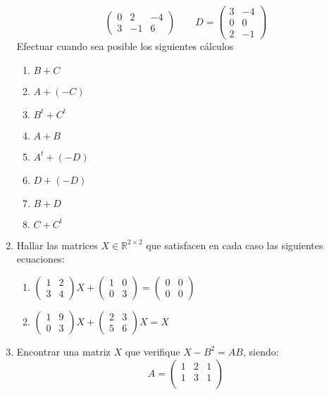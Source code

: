 \documentclass[12pt]{article}
\begin{document}
\begin{enumerate}
\[\begin{pmatrix}
0 & 2 & -4 \\
3 & -1 & 6
\end{pmatrix}
\qquad
D = \begin{pmatrix}
3 & -4\\
0 & 0\\
2 & -1
\end{pmatrix}
\]
Efectuar cuando sea posible los siguientes cálculos
\begin{multicols}{4}
\begin{enumerate}
  \item $B+C$
  \item $A+(-C)$
  \item $B^t + C^t$
  \item $A + B$
  \item $A^t + (-D)$
  \item $D+(-D)$
  \item $B + D$
  \item $C+C^t$
\end{enumerate}
\end{multicols}
\item Hallar las matrices $X \in \mathbb{R}^{2\times2}$ que satisfacen en cada caso las siguientes ecuaciones:
\begin{enumerate}
  \item $\begin{pmatrix}
    1 & 2\\
    3 & 4
  \end{pmatrix}X+\begin{pmatrix}
    1 & 0\\
    0 & 3
  \end{pmatrix} = \begin{pmatrix}
    0 & 0\\
    0 & 0
  \end{pmatrix}$
  \item $\begin{pmatrix}
    1 & 9\\
    0 & 3
  \end{pmatrix}X+\begin{pmatrix}
    2 & 3\\
    5 & 6
  \end{pmatrix}X = X$
\end{enumerate}
\item Encontrar una matriz $X$ que verifique $X - B^2 = AB$, siendo:
$$
A=\begin{pmatrix}
1 & 2 & 1\\
1 & 3 & 1\\

\end{pmatrix}$$
\end{enumerate}
\end{document}
